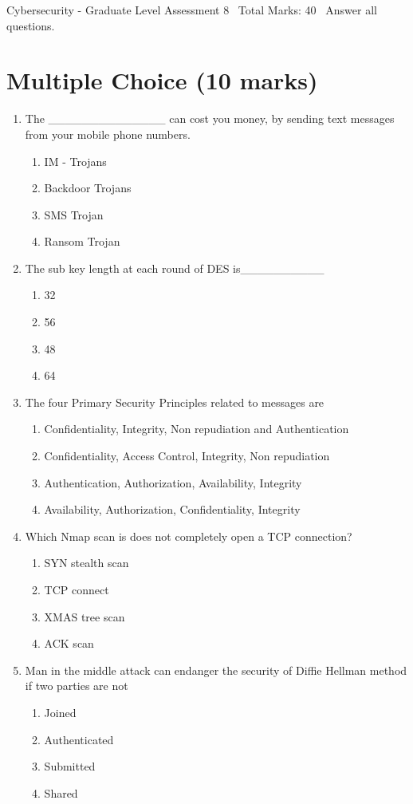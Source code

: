\documentclass[12pt]{article}
\begin{document}
\begin{center}
Cybersecurity - Graduate Level Assessment 8 \
Total Marks: 40 \
Answer all questions.
\end{center}

\section*{Multiple Choice (10 marks)}
\begin{enumerate}[label=\arabic*.]
\item The \_\_\_\_\_\_\_\_\_\_\_\_\_\_ can cost you money, by sending text messages from your mobile phone numbers.
\begin{enumerate}[label=(\alph*)]
    \item IM - Trojans
    \item Backdoor Trojans
    \item SMS Trojan
    \item Ransom Trojan
\end{enumerate}
\item The sub key length at each round of DES is\_\_\_\_\_\_\_\_\_\_
\begin{enumerate}[label=(\alph*)]
    \item 32
    \item 56
    \item 48
    \item 64
\end{enumerate}
\item The four Primary Security Principles related to messages are
\begin{enumerate}[label=(\alph*)]
    \item Confidentiality, Integrity, Non repudiation and Authentication
    \item Confidentiality, Access Control, Integrity, Non repudiation
    \item Authentication, Authorization, Availability, Integrity
    \item Availability, Authorization, Confidentiality, Integrity
\end{enumerate}
\item Which Nmap scan is does not completely open a TCP connection?
\begin{enumerate}[label=(\alph*)]
    \item SYN stealth scan
    \item TCP connect
    \item XMAS tree scan
    \item ACK scan
\end{enumerate}
\item Man in the middle attack can endanger the security of Diffie Hellman method if two parties are not
\begin{enumerate}[label=(\alph*)]
    \item Joined
    \item Authenticated
    \item Submitted
    \item Shared
\end{enumerate}
\end{enumerate}
\end{document}
